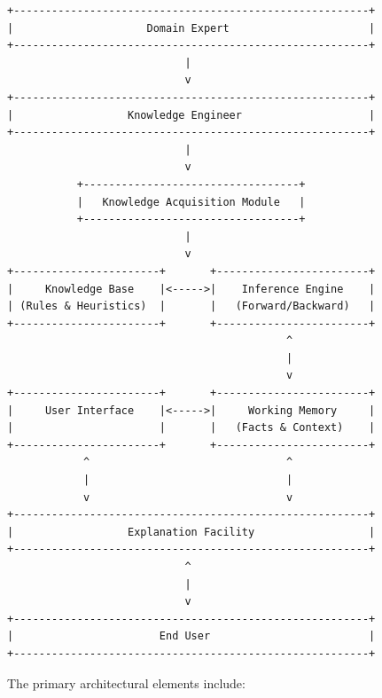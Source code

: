 \documentclass[12pt]{report}
\begin{document}
\begin{verbatim}
+--------------------------------------------------------+
|                     Domain Expert                      |
+--------------------------------------------------------+
                            |
                            v
+--------------------------------------------------------+
|                  Knowledge Engineer                    |
+--------------------------------------------------------+
                            |
                            v
           +----------------------------------+
           |   Knowledge Acquisition Module   |
           +----------------------------------+
                            |
                            v
+-----------------------+       +------------------------+
|     Knowledge Base    |<----->|    Inference Engine    |
| (Rules & Heuristics)  |       |   (Forward/Backward)   |
+-----------------------+       +------------------------+
                                            ^
                                            |
                                            v
+-----------------------+       +------------------------+
|     User Interface    |<----->|     Working Memory     |
|                       |       |   (Facts & Context)    |
+-----------------------+       +------------------------+
            ^                               ^
            |                               |
            v                               v
+--------------------------------------------------------+
|                  Explanation Facility                  |
+--------------------------------------------------------+
                            ^
                            |
                            v
+--------------------------------------------------------+
|                       End User                         |
+--------------------------------------------------------+
\end{verbatim}

The primary architectural elements include:
\end{document}
